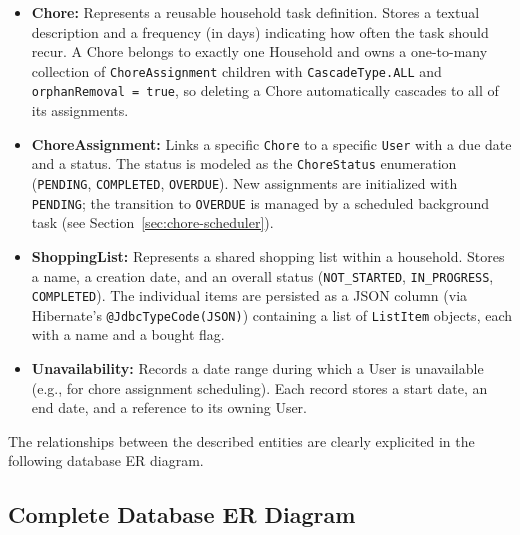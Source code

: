 \begin{itemize}
    \item \textbf{Chore:} Represents a reusable household task definition. Stores a textual description and a frequency (in days) indicating how often the task should recur. A Chore belongs to exactly one Household and owns a one-to-many collection of \texttt{ChoreAssignment} children with \texttt{CascadeType.ALL} and \texttt{orphanRemoval = true}, so deleting a Chore automatically cascades to all of its assignments.
    \item \textbf{ChoreAssignment:} Links a specific \texttt{Chore} to a specific \texttt{User} with a due date and a status. The status is modeled as the \texttt{ChoreStatus} enumeration (\texttt{PENDING}, \texttt{COMPLETED}, \texttt{OVERDUE}). New assignments are initialized with \texttt{PENDING}; the transition to \texttt{OVERDUE} is managed by a scheduled background task (see Section~\ref{sec:chore-scheduler}).
    \item \textbf{ShoppingList:} Represents a shared shopping list within a household. Stores a name, a creation date, and an overall status (\texttt{NOT\_STARTED}, \texttt{IN\_PROGRESS}, \texttt{COMPLETED}). The individual items are persisted as a JSON column (via Hibernate's \texttt{@JdbcTypeCode(JSON)}) containing a list of \texttt{ListItem} objects, each with a name and a bought flag.
    \item \textbf{Unavailability:} Records a date range during which a User is unavailable (e.g., for chore assignment scheduling). Each record stores a start date, an end date, and a reference to its owning User.
\end{itemize}

The relationships between the described entities are clearly explicited in the following database ER diagram.

\subsection{Complete Database ER Diagram}


